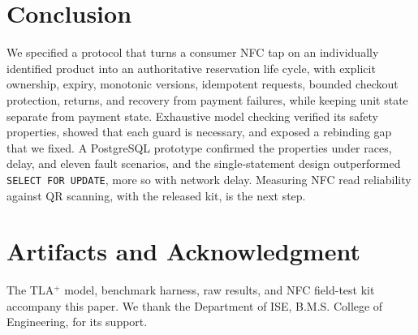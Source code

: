 \documentclass[conference]{IEEEtran}
\begin{document}
\section{Conclusion}

We specified a protocol that turns a consumer NFC tap on an
individually identified product into an authoritative reservation
life cycle, with explicit ownership, expiry, monotonic versions,
idempotent requests, bounded checkout protection, returns, and
recovery from payment failures, while keeping unit state separate
from payment state. Exhaustive model checking verified its safety
properties, showed that each guard is necessary, and exposed a
rebinding gap that we fixed. A PostgreSQL prototype confirmed the
properties under races, delay, and eleven fault scenarios, and the
single-statement design outperformed \texttt{SELECT~FOR~UPDATE},
more so with network delay. Measuring NFC read reliability against
QR scanning, with the released kit, is the next step.

\section*{Artifacts and Acknowledgment}
The TLA$^{+}$ model, benchmark harness, raw results, and NFC field-test
kit accompany this paper.
We thank the Department of ISE, B.M.S. College of Engineering, for its
support.
\end{document}
